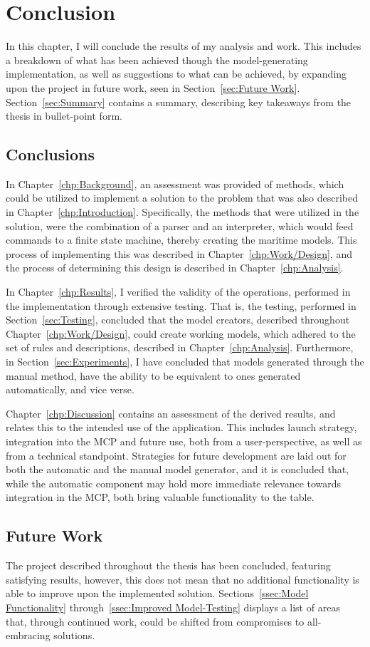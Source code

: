 \chapter{Conclusion}
In this chapter, I will conclude the results of my analysis and work. This includes a breakdown of what has been achieved though the model-generating implementation, as well as suggestions to what can be achieved, by expanding upon the project in future work, seen in Section~\ref{sec:Future Work}. Section~\ref{sec:Summary} contains a summary, describing key takeaways from the thesis in bullet-point form.
\section{Conclusions}
In Chapter~\ref{chp:Background}, an assessment was provided of methods, which could be utilized to implement a solution to the problem that was also described in Chapter~\ref{chp:Introduction}. Specifically, the methods that were utilized in the solution, were the combination of a parser and an interpreter, which would feed commands to a finite state machine, thereby creating the maritime models. This process of implementing this was described in Chapter~\ref{chp:Work/Design}, and the process of determining this design is described in Chapter~\ref{chp:Analysis}.

In Chapter~\ref{chp:Results}, I verified the validity of the operations, performed in the implementation through extensive testing. That is, the testing, performed in Section~\ref{sec:Testing}, concluded that the model creators, described throughout Chapter~\ref{chp:Work/Design}, could create working models, which adhered to the set of rules and descriptions, described in Chapter~\ref{chp:Analysis}. Furthermore, in Section~\ref{sec:Experiments}, I have concluded that models generated through the manual method, have the ability to be equivalent to ones generated automatically, and vice verse.

Chapter~\ref{chp:Discussion} contains an assessment of the derived results, and relates this to the intended use of the application. This includes launch strategy, integration into the MCP and future use, both from a user-perspective, as well as from a technical standpoint. Strategies for future development are laid out for both the automatic and the manual model generator, and it is concluded that, while the automatic component may hold more immediate relevance towards integration in the MCP, both bring valuable functionality to the table.
\section{Future Work}
The project described throughout the thesis has been concluded, featuring satisfying results, however, this does not mean that no additional functionality is able to improve upon the implemented solution. Sections~\ref{ssec:Model Functionality} through~\ref{ssec:Improved Model-Testing} displays a list of areas that, through continued work, could be shifted from compromises to all-embracing solutions.
